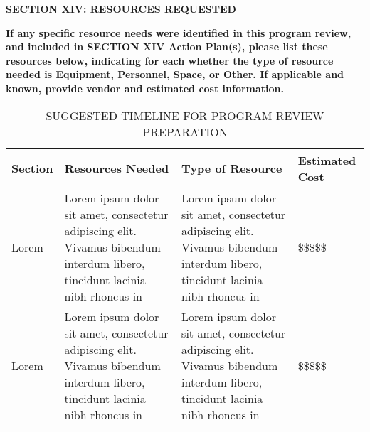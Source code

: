 \textbf{SECTION XIV: RESOURCES REQUESTED}


\textbf{If any specific resource needs were identified in this program review, and included in SECTION XIV Action Plan(s), please list these resources below, indicating for each whether the type of resource needed is Equipment, Personnel, Space, or Other. If applicable and known, provide vendor and estimated cost information.}





\begin{center}
 \begin{longtable}[c]{ |m{1.5cm}| m{5cm} | m{5cm}|m{1.7cm}|  }
 \caption{SUGGESTED TIMELINE FOR PROGRAM REVIEW PREPARATION }
\hline
 \textbf{Section} & \textbf{Resources Needed} & \textbf{Type of Resource} & \textbf{Estimated Cost} \\ 
 \hline\hline
Lorem & Lorem ipsum dolor sit amet, consectetur adipiscing elit. Vivamus bibendum interdum libero, tincidunt lacinia nibh rhoncus in & Lorem ipsum dolor sit amet, consectetur adipiscing elit. Vivamus bibendum interdum libero, tincidunt lacinia nibh rhoncus in & \$\$\$\$\$
 \\ 
 \hline
 Lorem  & Lorem ipsum dolor sit amet, consectetur adipiscing elit. Vivamus bibendum interdum libero, tincidunt lacinia nibh rhoncus in & Lorem ipsum dolor sit amet, consectetur adipiscing elit. Vivamus bibendum interdum libero, tincidunt lacinia nibh rhoncus in & \$\$\$\$\$
 \\ 
 \hline
\end{longtable}
\end{center}








































